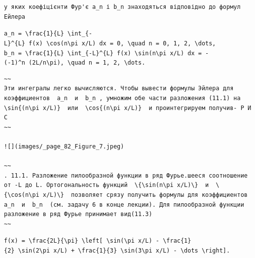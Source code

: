 \documentclass[
  ukrainian,
]{article}
\begin{document}
\begin{verbatim}
у яких коефіцієнти Фур'є a_n і b_n знаходяться відповідно до формул Ейлера
\end{verbatim}

\texttt{a\_n\ =\ \textbackslash{}frac\{1\}\{L\}\ \textbackslash{}int\_\{-L\}\^{}\{L\}\ f(x)\ \textbackslash{}cos(n\textbackslash{}pi\ x/L)\ dx\ =\ 0,\ \textbackslash{}quad\ n\ =\ 0,\ 1,\ 2,\ \textbackslash{}dots,}
\texttt{b\_n\ =\ \textbackslash{}frac\{1\}\{L\}\ \textbackslash{}int\_\{-L\}\^{}\{L\}\ f(x)\ \textbackslash{}sin(n\textbackslash{}pi\ x/L)\ dx\ =\ -(-1)\^{}n\ (2L/n\textbackslash{}pi),\ \textbackslash{}quad\ n\ =\ 1,\ 2,\ \textbackslash{}dots.}

\begin{verbatim}
~~
Эти ингегралы легко вычисляются. Чтобы вывести формулы Эйлера для коэффициентов  a_n  и  b_n , умножим обе части разложения (11.1) на  \sin{(n\pi x/L)}  или  \cos{(n\pi x/L)}  и проинтегрируем получив- Р И С
~~

![](images/_page_82_Figure_7.jpeg)

~~
. 11.1. Разложение пилообразной функции в ряд Фурье.шееся соотношение от -L до L. Ортогональность функций  \{\sin(n\pi x/L)\}  и  \{\cos(n\pi x/L)\}  позволяет срязу получить формулы для коэффициентов  a_n  и  b_n  (см. задачу 6 в конце лекции). Для пилообразной функции разложение в ряд Фурье принимает вид(11.3)
~~
\end{verbatim}

\texttt{f(x)\ =\ \textbackslash{}frac\{2L\}\{\textbackslash{}pi\}\ \textbackslash{}left{[}\ \textbackslash{}sin(\textbackslash{}pi\ x/L)\ -\ \textbackslash{}frac\{1\}\{2\}\ \textbackslash{}sin(2\textbackslash{}pi\ x/L)\ +\ \textbackslash{}frac\{1\}\{3\}\ \textbackslash{}sin(3\textbackslash{}pi\ x/L)\ -\ \textbackslash{}dots\ \textbackslash{}right{]}.}
\end{document}
